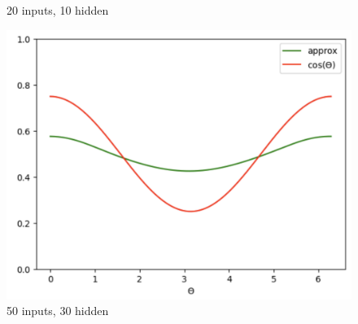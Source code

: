 \documentclass[12pt, a4paper]{article}
\begin{document}
\begin{itemize}
\begin{figure}
        \caption{20 inputs, 10 hidden}
        \label{fig:enter-label}
    \end{figure}
    \begin{figure}
        \centering
        \includegraphics[width=0.5\linewidth]{50, 30 parameters.png}
        \caption{50 inputs, 30 hidden}
        \label{fig:enter-label}
    \end{figure}

\end{itemize}

\newpage
\end{document}
